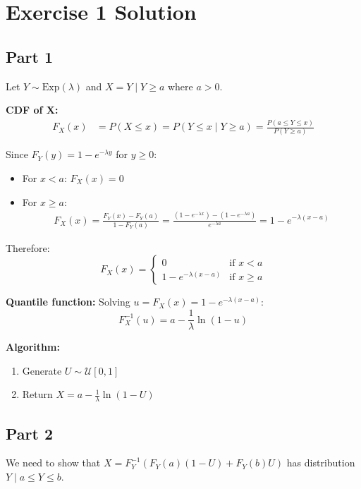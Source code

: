 \section*{Exercise 1 Solution}

\subsection*{Part 1}
Let $Y \sim \text{Exp}(\lambda)$ and $X = Y \mid Y \geq a$ where $a > 0$.

\textbf{CDF of X:}
\begin{align}
F_X(x) &= P(X \leq x) = P(Y \leq x \mid Y \geq a) = \frac{P(a \leq Y \leq x)}{P(Y \geq a)}
\end{align}

Since $F_Y(y) = 1 - e^{-\lambda y}$ for $y \geq 0$:
\begin{itemize}
\item For $x < a$: $F_X(x) = 0$
\item For $x \geq a$: 
\begin{align}
F_X(x) = \frac{F_Y(x) - F_Y(a)}{1 - F_Y(a)} = \frac{(1-e^{-\lambda x}) - (1-e^{-\lambda a})}{e^{-\lambda a}} = 1 - e^{-\lambda(x-a)}
\end{align}
\end{itemize}

Therefore:
\begin{equation}
F_X(x) = \begin{cases} 
0 & \text{if } x < a \\ 
1 - e^{-\lambda(x-a)} & \text{if } x \geq a 
\end{cases}
\end{equation}

\textbf{Quantile function:} Solving $u = F_X(x) = 1 - e^{-\lambda(x-a)}$:
\begin{equation}
F_X^{-1}(u) = a - \frac{1}{\lambda}\ln(1-u)
\end{equation}

\textbf{Algorithm:}
\begin{enumerate}
\item Generate $U \sim \mathcal{U}[0,1]$
\item Return $X = a - \frac{1}{\lambda}\ln(1-U)$
\end{enumerate}

\subsection*{Part 2}
We need to show that $X = F_Y^{-1}(F_Y(a)(1-U) + F_Y(b)U)$ has distribution $Y \mid a \leq Y \leq b$.

